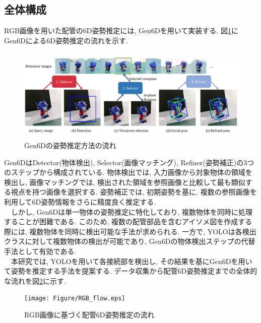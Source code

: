 \subsection{全体構成}
RGB画像を用いた配管の6D姿勢推定には, Gen6Dを用いて実装する. 
図\ref{fig:2-f2}にGen6Dによる6D姿勢推定の流れを示す. 
\begin{figure}[htbt]
	\centering
	 \includegraphics[height=45mm]{Figure/Gen6D.eps}
	 \caption{Gen6Dの姿勢推定方法の流れ}
	 \label{fig:2-f2}
\end{figure}

Gen6DはDetector(物体検出), Selector(画像マッチング), Refiner(姿勢補正)の3つのステップから構成されている. 
物体検出では, 入力画像から対象物体の領域を検出し, 画像マッチングでは, 検出された領域を参照画像と比較して最も類似する視点を持つ画像を選択する. 
姿勢補正では, 初期姿勢を基に, 複数の参照画像を利用して6D姿勢情報をさらに精度良く推定する. \\
　しかし, Gen6Dは単一物体の姿勢推定に特化しており, 複数物体を同時に処理することが困難である. 
このため, 複数の配管部品を含むアイソメ図を作成する際には, 複数物体を同時に検出可能な手法が求められる. 
一方で, YOLOは各検出クラスに対して複数物体の検出が可能であり, Gen6Dの物体検出ステップの代替手法として有効である. \\
　本研究では, YOLOを用いて各接続部を検出し, その結果を基にGen6Dを用いて姿勢を推定する手法を提案する. 
データ収集から配管6D姿勢推定までの全体的な流れを図\ref{fig:2-f3}に示す. 
\begin{figure}[htbt]
	\centering
	 \texttt{[image: Figure/RGB\_flow.eps]}
	 \caption{RGB画像に基づく配管6D姿勢推定の流れ}
	 \label{fig:2-f3}
\end{figure}


